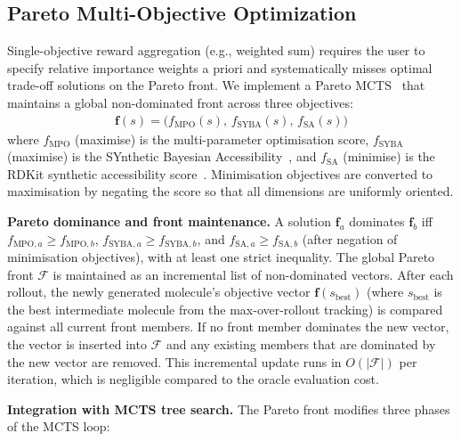 \documentclass[jcim,article,layout=manuscript]{achemso}
\begin{document}
\subsection{Pareto Multi-Objective Optimization}
\label{sec:pareto}

Single-objective reward aggregation (e.g., weighted sum) requires the user
to specify relative importance weights a priori and systematically misses
optimal trade-off solutions on the Pareto front. We implement a Pareto
MCTS~\cite{Mothra2024} that maintains a global non-dominated front across
three objectives:
\begin{align}
  \mathbf{f}(s) = \bigl(f_{\text{MPO}}(s),\, f_{\text{SYBA}}(s),\, f_{\text{SA}}(s)\bigr)
  \label{eq:objectives}
\end{align}
where $f_{\text{MPO}}$ (maximise) is the multi-parameter optimisation
score, $f_{\text{SYBA}}$ (maximise) is the SYnthetic Bayesian
Accessibility~\cite{Vorsilak2020}, and $f_{\text{SA}}$ (minimise) is the
RDKit synthetic accessibility score~\cite{Ertl2009}. Minimisation objectives
are converted to maximisation by negating the score so that all dimensions
are uniformly oriented.

\textbf{Pareto dominance and front maintenance.} A solution $\mathbf{f}_a$
dominates $\mathbf{f}_b$ iff $f_{\text{MPO},a} \geq f_{\text{MPO},b}$,
$f_{\text{SYBA},a} \geq f_{\text{SYBA},b}$, and
$f_{\text{SA},a} \geq f_{\text{SA},b}$ (after negation of minimisation
objectives), with at least one strict inequality. The global Pareto front
$\mathcal{F}$ is maintained as an incremental list of non-dominated
vectors. After each rollout, the newly generated molecule's objective
vector $\mathbf{f}(s_{\text{best}})$ (where $s_{\text{best}}$ is the
best intermediate molecule from the max-over-rollout tracking) is compared
against all current front members. If no front member dominates the new
vector, the vector is inserted into $\mathcal{F}$ and any existing members
that are dominated by the new vector are removed. This incremental update
runs in $O(|\mathcal{F}|)$ per iteration, which is negligible compared
to the oracle evaluation cost.

\textbf{Integration with MCTS tree search.} The Pareto front modifies
three phases of the MCTS loop:
\end{document}
